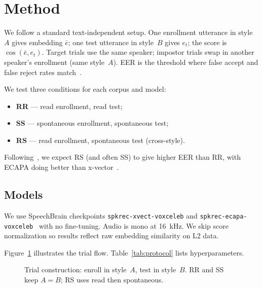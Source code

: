 \documentclass[cameraready]{Interspeech}
\begin{document}
\section{Method}
\label{sec:method}

We follow a standard text-independent setup. One enrollment utterance in style~$A$ gives embedding $\bar{e}$; one test utterance in style~$B$ gives $e_t$; the score is $\cos(\bar{e}, e_t)$. Target trials use the same speaker; impostor trials swap in another speaker's enrollment (same style~$A$). EER is the threshold where false accept and false reject rates match~\cite{snyder2018xvector}.

We test three conditions for each corpus and model:
\begin{itemize}
  \item \textbf{RR} --- read enrollment, read test;
  \item \textbf{SS} --- spontaneous enrollment, spontaneous test;
  \item \textbf{RS} --- read enrollment, spontaneous test (cross-style).
\end{itemize}

Following~\cite{martinek2025read,park2018style,javali2024style}, we expect RS (and often SS) to give higher EER than RR, with ECAPA doing better than x-vector~\cite{desplanques2020ecapa}.

\subsection{Models}

We use SpeechBrain checkpoints \texttt{spkrec-xvect-voxceleb} and \texttt{spkrec-ecapa-voxceleb}~\cite{ravanelli2021speechbrain} with no fine-tuning. Audio is mono at \SI{16}{\kilo\hertz}. We skip score normalization so results reflect raw embedding similarity on L2 data.

Figure~\ref{fig:protocol} illustrates the trial flow. Table~\ref{tab:protocol} lists hyperparameters.

\begin{figure}[H]
  \centering
  \caption{Trial construction: enroll in style~$A$, test in style~$B$. RR and SS keep $A{=}B$; RS uses read then spontaneous.}
  \label{fig:protocol}
\end{figure}
\end{document}
